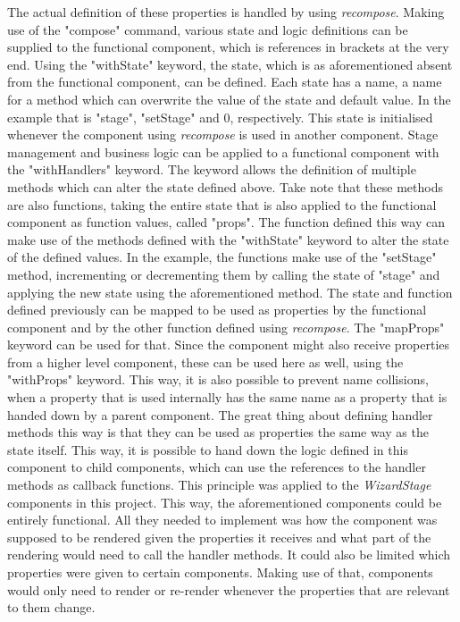The actual definition of these properties is handled by using \textit{recompose}. Making use of the "compose" command, various state and logic definitions can be supplied to the functional component, which is references in brackets at the very end. Using the "withState" keyword, the state, which is as aforementioned absent from the functional component, can be defined. Each state has a name, a name for a method which can overwrite the value of the state and default value. In the example that is "stage", "setStage" and 0, respectively. This state is initialised whenever the component using \textit{recompose} is used in another component.
\newline
Stage management and business logic can be applied to a functional component with the "withHandlers" keyword. The keyword allows the definition of multiple methods which can alter the state defined above. Take note that these methods are also functions, taking the entire state that is also applied to the functional component as function values, called "props". The function defined this way can make use of the methods defined with the "withState" keyword to alter the state of the defined values. In the example, the functions make use of the "setStage" method, incrementing or decrementing them by calling the state of "stage" and applying the new state using the aforementioned method.
\newline
The state and function defined previously can be mapped to be used as properties by the functional component and by the other function defined using \textit{recompose}. The "mapProps" keyword can be used for that. Since the component might also receive properties from a higher level component, these can be used here as well, using the "withProps" keyword. This way, it is also possible to prevent name collisions, when a property that is used internally has the same name as a property that is handed down by a parent component.
\newline
The great thing about defining handler methods this way is that they can be used as properties the same way as the state itself. This way, it is possible to hand down the logic defined in this component to child components, which can use the references to the handler methods as callback functions. This principle was applied to the \textit{WizardStage} components in this project. This way, the aforementioned components could be entirely functional. All they needed to implement was how the component was supposed to be rendered given the properties it receives and what part of the rendering would need to call the handler methods. It could also be limited which properties were given to certain components. Making use of that, components would only need to render or re-render whenever the properties that are relevant to them change.
